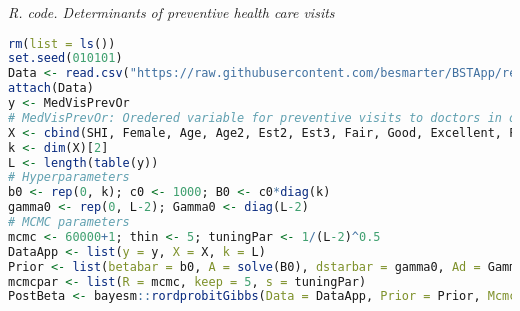 \begin{tcolorbox}[enhanced,width=4.67in,center upper,
	fontupper=\large\bfseries,drop shadow southwest,sharp corners]
	\textit{R. code. Determinants of preventive health care visits}
	\begin{VF}
		\begin{lstlisting}[language=R]		
rm(list = ls())
set.seed(010101)
Data <- read.csv("https://raw.githubusercontent.com/besmarter/BSTApp/refs/heads/master/DataApp/2HealthMed.csv", sep = ",", header = TRUE, quote = "")
attach(Data)
y <- MedVisPrevOr 
# MedVisPrevOr: Oredered variable for preventive visits to doctors in one year: 1 (none), 2 (once), ... 6 (five or more)
X <- cbind(SHI, Female, Age, Age2, Est2, Est3, Fair, Good, Excellent, PriEd, HighEd, VocEd, UnivEd)
k <- dim(X)[2]
L <- length(table(y))
# Hyperparameters
b0 <- rep(0, k); c0 <- 1000; B0 <- c0*diag(k)
gamma0 <- rep(0, L-2); Gamma0 <- diag(L-2)
# MCMC parameters
mcmc <- 60000+1; thin <- 5; tuningPar <- 1/(L-2)^0.5
DataApp <- list(y = y, X = X, k = L)
Prior <- list(betabar = b0, A = solve(B0), dstarbar = gamma0, Ad = Gamma0)
mcmcpar <- list(R = mcmc, keep = 5, s = tuningPar)
PostBeta <- bayesm::rordprobitGibbs(Data = DataApp, Prior = Prior, Mcmc = mcmcpar)
\end{lstlisting}
	\end{VF}
\end{tcolorbox} 

